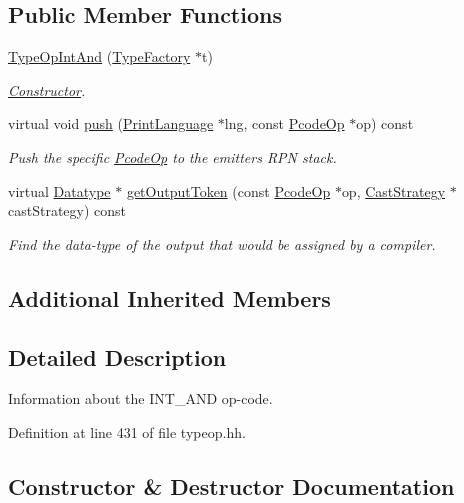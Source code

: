 \subsection*{Public Member Functions}
\begin{DoxyCompactItemize}
\item 
\mbox{\hyperlink{class_type_op_int_and_abacd675bc86f45ae2918e9e3c76e6090}{Type\+Op\+Int\+And}} (\mbox{\hyperlink{class_type_factory}{Type\+Factory}} $\ast$t)
\begin{DoxyCompactList}\small\item\em \mbox{\hyperlink{class_constructor}{Constructor}}. \end{DoxyCompactList}\item 
virtual void \mbox{\hyperlink{class_type_op_int_and_a589ee5be6f2e2b381a0c389b47fff39f}{push}} (\mbox{\hyperlink{class_print_language}{Print\+Language}} $\ast$lng, const \mbox{\hyperlink{class_pcode_op}{Pcode\+Op}} $\ast$op) const
\begin{DoxyCompactList}\small\item\em Push the specific \mbox{\hyperlink{class_pcode_op}{Pcode\+Op}} to the emitter\textquotesingle{}s R\+PN stack. \end{DoxyCompactList}\item 
virtual \mbox{\hyperlink{class_datatype}{Datatype}} $\ast$ \mbox{\hyperlink{class_type_op_int_and_a4f06c12390fbbad57e41537047666e2d}{get\+Output\+Token}} (const \mbox{\hyperlink{class_pcode_op}{Pcode\+Op}} $\ast$op, \mbox{\hyperlink{class_cast_strategy}{Cast\+Strategy}} $\ast$cast\+Strategy) const
\begin{DoxyCompactList}\small\item\em Find the data-\/type of the output that would be assigned by a compiler. \end{DoxyCompactList}\end{DoxyCompactItemize}
\subsection*{Additional Inherited Members}


\subsection{Detailed Description}
Information about the I\+N\+T\+\_\+\+A\+ND op-\/code. 

Definition at line 431 of file typeop.\+hh.



\subsection{Constructor \& Destructor Documentation}
\mbox{\label{class_type_op_int_and_abacd675bc86f45ae2918e9e3c76e6090}} 
